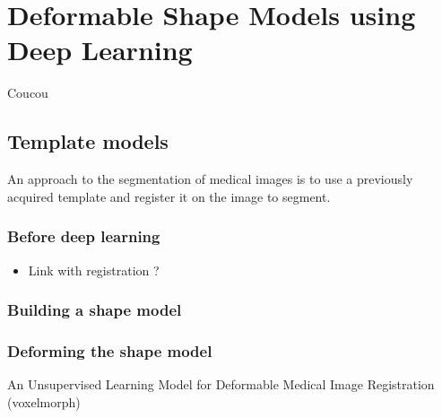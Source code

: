 \chapter{Deformable Shape Models using Deep Learning}
\label{chap:seg}

\begin{chapabstract}
 Coucou
\end{chapabstract}

\vspace{1cm}

{   
    \minitoc
}

\newpage

\section{Template models}

An approach to the segmentation of medical images is to use a previously acquired template and register it on the image to segment.



\subsection{Before deep learning}

\begin{itemize}
    \item Link with registration ?
\end{itemize}

\subsection{Building a shape model}

\subsection{Deforming the shape model}

An Unsupervised Learning Model for Deformable Medical Image Registration (voxelmorph)

